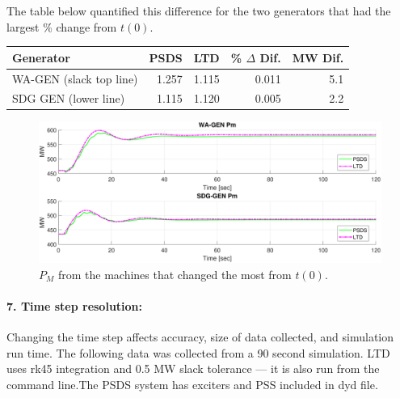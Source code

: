 \documentclass[12pt]{article}
\begin{document}
The table below quantified this difference for the two generators that had the largest \% change from $t(0)$.

\begin{table}[!ht]
	\centering
	\begin{tabular}{@{} lrrrr @{}} 	
		\toprule %
		\footnotesize %
		 Generator & PSDS  & LTD  & \% $\Delta$ Dif. & MW Dif.  \\
		\midrule		
		WA-GEN (slack top line) & 1.257  & 1.115  & 0.011   & 5.1\\
		SDG GEN (lower line) & 1.115  & 1.120  & 0.005 & 2.2 \\
		\bottomrule
	\end{tabular}

\end{table}

	\begin{figure}[h!]
			\centering
			\includegraphics[width=\linewidth]{pmCompare}\vspace{-1em}
			\caption{$P_M$ from the machines that changed the most from $t(0)$.}
			\label{pmCompare}		 
	\end{figure}\vspace{-.5em}

\pagebreak
\paragraph{7. Time step resolution:} Changing the time step affects accuracy, size of data collected, and simulation run time. The following data was collected from a 90 second simulation. LTD uses rk45 integration and 0.5 MW slack tolerance --- it is also run from the command line.The PSDS system has exciters and PSS included in dyd file.
\end{document}

